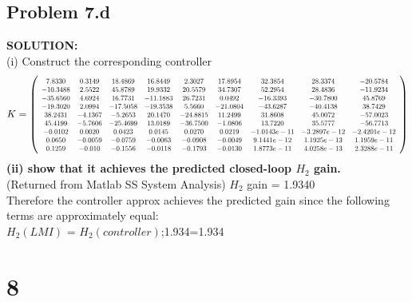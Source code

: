 \documentclass[10pt,a4paper]{article}
\newcommand\scalemath[2]{\scalebox{#1}{\mbox{\ensuremath{\displaystyle #2}}}}
\begin{document}
\subsection{Problem 7.d}
\begin{tcolorbox}
\textbf{SOLUTION:}\\
(i) Construct the corresponding controller
$$K=\left(
\scalemath{0.7}{
\begin{array}{ccccccccc} 7.8330 & 0.3149 & 18.4869 & 16.8449 & 2.3027 & 17.8954 & 32.3854 & 28.3374 & -20.5784\\ -10.3488 & 2.5522 & 45.8789 & 19.9332 & 20.5579 & 34.7307 & 52.2954 & 28.4836 & -11.9234\\ -35.6560 & 4.6924 & 16.7731 & -11.1883 & 26.7231 & 0.0492 & -16.3393 & -30.7800 & 45.8769\\ -19.3020 & 2.0994 & -17.5058 & -19.3538 & 5.5660 & -21.0804 & -43.6287 & -40.4138 & 38.7429\\ 38.2431 & -4.1367 & -5.2653 & 20.1470 & -24.8815 & 11.2499 & 31.8608 & 45.0072 & -57.0023\\ 45.4199 & -5.7606 & -25.4699 & 13.0189 & -36.7500 & -1.0806 & 13.7220 & 35.5777 & -56.7713\\ -0.0102 & 0.0020 & 0.0423 & 0.0145 & 0.0270 & 0.0219 & -1.0143e-11 & -3.2897e-12 & -2.4201e-12\\ 0.0650 & -0.0059 & -0.0759 & -0.0063 & -0.0908 & -0.0049 & 9.1441e-12 & 1.1925e-13 & 1.1959e-11\\ 0.1259 & -0.010 & -0.1556 & -0.0118 & -0.1793 & -0.0130 & 1.8773e-11 & 4.0258e-13 & 2.3288e-11 
\end{array}
}
\right)
$$
\textbf{(ii) show that it achieves the predicted closed-loop $H_2$ gain.}\\
(Returned from Matlab SS System Analysis) $H_2$ gain = 1.9340\\

Therefore the controller approx achieves the predicted gain since the following terms are approximately equal:\\
$H_2(LMI)$ = $H_2(controller)$;1.934=1.934
\end{tcolorbox}


\section{8}
\end{document}
